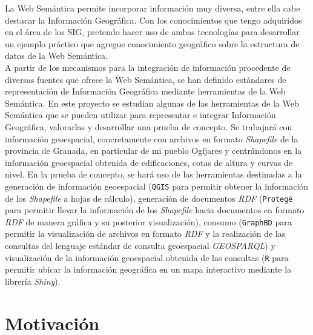 

La Web Semántica permite incorporar información muy diversa, entre ella cabe destacar la Información Geográfica. Con los conocimientos que tengo adquiridos en el área de los SIG, pretendo hacer uso de ambas tecnologías para desarrollar un ejemplo práctico que agregue conocimiento geográfico sobre la estructura de datos de la Web Semántica. \\ %

A partir de los mecanismos para la integración de información procedente de diversas fuentes que ofrece la Web Semántica, se han definido estándares de representación de Información Geográfica mediante herramientas de la Web Semántica. En este proyecto se estudian algunas de las herramientas de la Web Semántica que se pueden utilizar para representar e integrar Información Geográfica, valorarlas y desarrollar una prueba de concepto. Se trabajará con información geoespacial, concretamente con archivos en formato \textit{Shapefile} de la provincia de Granada, en particular de mi pueblo Ogíjares y centrándonos en la información geoespacial obtenida de edificaciones, cotas de altura y curvas de nivel. En la prueba de concepto, se hará uso de las herramientas destinadas a la generación de información geoespacial (\texttt{QGIS} para permitir obtener la información de los \textit{Shapefile} a hojas de cálculo), generación de documentos \textit{RDF}  (\texttt{Protegé} para permitir llevar la información de los \textit{Shapefile} hacia documentos en formato \textit{RDF} de manera gráfica y su posterior visualización), consumo (\texttt{GraphBD} para permitir la visualización de archivos en formato \textit{RDF} y la realización de las consultas del lenguaje estándar de consulta geoespacial \textit{GEOSPARQL}) y visualización de la información geoespacial obtenida de las consultas (\texttt{R} para permitir ubicar la información geográfica en un mapa interactivo mediante la librería \textit{Shiny}).


\section{Motivación}

